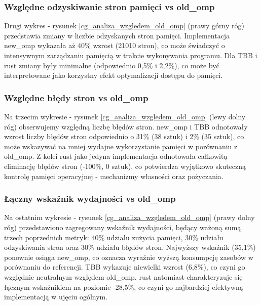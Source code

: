 \subsubsection{Względne odzyskiwanie stron pamięci vs old\_omp}
Drugi wykres - rysunek \ref{cg_analiza_wzgledem_old_omp} (prawy górny róg) przedstawia zmiany w liczbie odzyskanych stron pamięci. Implementacja new\_omp wykazała aż 40\% wzrost (21010 stron), co może świadczyć o intensywnym zarządzaniu pamięcią w trakcie wykonywania programu. Dla TBB i rust zmiany były minimalne (odpowiednio 0,5\% i 2,2\%), co może być interpretowane jako korzystny efekt optymalizacji dostępu do pamięci.

\subsubsection{Względne błędy stron vs old\_omp}
Na trzecim wykresie - rysunek \ref{cg_analiza_wzgledem_old_omp} (lewy dolny róg) obserwujemy względną liczbę błędów stron. new\_omp i TBB odnotowały wzrost liczby błędów stron odpowiednio o 31\% (38 sztuk) i 2\% (35 sztuk), co może wskazywać na mniej wydajne wykorzystanie pamięci w porównaniu z old\_omp. Z kolei rust jako jedyna implementacja odnotowała całkowitą eliminację błędów stron (-100\%, 0 sztuk), co potwierdza wyjątkowo skuteczną kontrolę pamięci operacyjnej - mechanizmy własności oraz pożyczania.

\subsubsection{Łączny wskaźnik wydajności vs old\_omp}
Na ostatnim wykresie - rysunek \ref{cg_analiza_wzgledem_old_omp} (prawy dolny róg) przedstawiono zagregowany wskaźnik wydajności, będący ważoną sumą trzech poprzednich metryk: 40\% udziału zużycia pamięci, 30\% udziału odzyskiwania stron oraz 30\% udziału błędów stron. Najwyższy wskaźnik (35,1\%) ponownie osiąga new\_omp, co oznacza wyraźnie wyższą konsumpcję zasobów w porównaniu do referencji. TBB wykazuje niewielki wzrost (6,8\%), co czyni go względnie neutralnym względem old\_omp. rust natomiast charakteryzuje się łącznym wskaźnikiem na poziomie -28,5\%, co czyni go najbardziej efektywną implementacją w ujęciu ogólnym.

